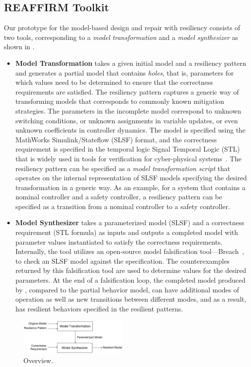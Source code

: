 \subsection{REAFFIRM Toolkit}
%
Our \toolreaffirm prototype for the model-based design and repair with resiliency consists of two tools, corresponding to a \emph{model transformation} and a \emph{model synthesizer} as shown in .
%
\begin{itemize}[leftmargin= 2 em]
    \item \textbf{Model Transformation} takes a given initial model and a resiliency pattern and generates a partial model that contains \emph{holes}, that is, parameters for which values need to be determined to ensure that the correctness requirements are satisfied. The resiliency pattern captures a generic way of transforming models that corresponds to commonly known mitigation strategies. The parameters in the incomplete model correspond to unknown switching conditions, or unknown assignments in variable updates, or even unknown coefficients in controller dynamics. The model is specified using the MathWorks Simulink/Stateflow (SLSF) format, and the correctness requirement is specified in the temporal logic Signal Temporal Logic (STL) that is widely used in tools for verification for cyber-physical systems~\cite{maler2004monitoring}. The resiliency pattern can be specified as a \emph{model transformation script} that operates on the internal representation of SLSF models specifying the desired transformation in a generic way. As an example, for a system that contains a nominal controller and a safety controller, a resiliency pattern can be specified as a transition from a nominal controller to a safety controller.
%
\item \textbf{Model Synthesizer} takes a parameterized model (SLSF) and a correctness requirement (STL formula) as inputs and outputs a completed model with parameter values instantiated to satisfy the correctness requirements.  Internally, the tool utilizes an open-source model falsification tool---Breach~\cite{donze2010breach}, to check an SLSF model against the specification. The counterexamples returned by this falsification tool are used to determine values for the desired parameters. At the end of a falsification loop, the completed model produced by \toolreaffirm, compared to the partial behavior model, can have additional modes of operation as well as new transitions between different modes, and as a result, has resilient behaviors specified in the resilient patterns.
\end{itemize}
%
%
%
%
\begin{figure}[t!]%
	\centering%
    \includegraphics[width=0.48\textwidth]{image/overview}%
	\caption{\toolreaffirm Overview.}%
\end{figure}%
%
%

